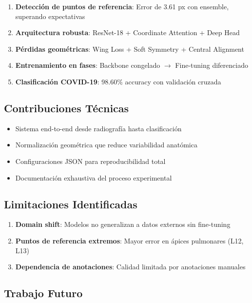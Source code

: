 \documentclass[12pt,a4paper]{article}
\begin{document}
\begin{enumerate}
    \item \textbf{Detección de puntos de referencia}: Error de 3.61 px con ensemble, superando expectativas
    \item \textbf{Arquitectura robusta}: ResNet-18 + Coordinate Attention + Deep Head
    \item \textbf{Pérdidas geométricas}: Wing Loss + Soft Symmetry + Central Alignment
    \item \textbf{Entrenamiento en fases}: Backbone congelado $\rightarrow$ Fine-tuning diferenciado
    \item \textbf{Clasificación COVID-19}: 98.60\% accuracy con validación cruzada
\end{enumerate}

\subsection{Contribuciones Técnicas}

\begin{itemize}
    \item Sistema end-to-end desde radiografía hasta clasificación
    \item Normalización geométrica que reduce variabilidad anatómica
    \item Configuraciones JSON para reproducibilidad total
    \item Documentación exhaustiva del proceso experimental
\end{itemize}

\subsection{Limitaciones Identificadas}

\begin{enumerate}
    \item \textbf{Domain shift}: Modelos no generalizan a datos externos sin fine-tuning
    \item \textbf{Puntos de referencia extremos}: Mayor error en ápices pulmonares (L12, L13)
    \item \textbf{Dependencia de anotaciones}: Calidad limitada por anotaciones manuales
\end{enumerate}

\subsection{Trabajo Futuro}
\end{document}
